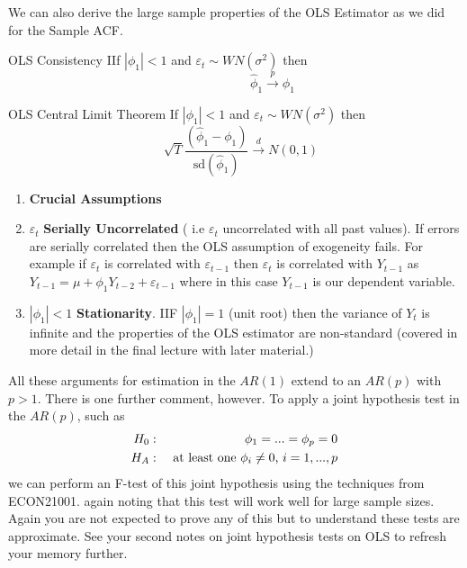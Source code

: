 \documentclass[openany]{tufte-book} %
\begin{document}
We can also derive the large sample properties of the OLS Estimator as we did for the Sample ACF.

 \begin{mytheo}{OLS Consistency} IIf $|\phi_1|<1$ and $\varepsilon_t\sim WN(\sigma^2)$ then 
 	\begin{equation*} \qquad\qquad\qquad\hat{\phi}_1\overset{p}{\rightarrow} \phi_1 \end{equation*} \end{mytheo}
 
\begin{mytheo}{ OLS Central Limit Theorem} If $|\phi_1|<1$ and $\varepsilon_t\sim WN(\sigma^2)$ then	
	\begin{equation} \label{olsclt}	\quad\sqrt{T}\frac{(\hat{\phi}_1-\phi_1)}{\textrm{sd}(\hat{\phi}_1)} \overset{d}{\rightarrow}N\left( 0,1\right)	\end{equation} \end{mytheo}

\begin{enumerate}
	\item[] \textbf{Crucial Assumptions}
	\item$\varepsilon_t$ \textbf{Serially Uncorrelated} ( i.e $\varepsilon_t$  uncorrelated with all past values). If errors are serially correlated then the OLS assumption of exogeneity fails. For example if $\varepsilon_t$ is correlated with $\varepsilon_{t-1}$ then  $\varepsilon_t$ is correlated with $Y_{t-1}$ as $Y_{t-1}=\mu+\phi_1 Y_{t-2}+ \varepsilon_{t-1}$ where in this case $Y_{t-1}$ is our dependent variable.
	\item $|\phi_1|<1$   \textbf{Stationarity}. IIF $|\phi_1|=1$ (unit root) then the variance of $Y_t$ is infinite and the properties of the OLS estimator are non-standard (covered in more detail in the final lecture with later material.)
\end{enumerate}

All these arguments for estimation in the $AR(1)$ extend to an $AR(p)$ with $%
p>1$. There is one further comment, however. To apply a joint hypothesis
test in the $AR(p)$, such as%
\begin{eqnarray}
H_{0} &:&\phi _{1}=...=\phi _{p}=0  \label{HO_zero coefficients} \\
H_{A} &:&\text{ at least one }\phi _{i}\neq 0\text{, }i=1,...,p  \notag
\end{eqnarray}
we can perform an F-test of this joint hypothesis using the techniques from ECON21001.  again noting that this test will work well for large sample sizes. Again you are not expected to prove any of this but to understand these tests are approximate. See your second notes on joint hypothesis tests on OLS to refresh your memory further.
\end{document}
